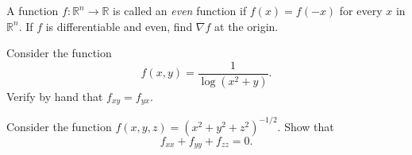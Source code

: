 \documentclass[openany]{book}
\newcommand{\R}{\mathbb{R}}
\begin{document}
\begin{prob}
    A function $f\colon\R^n\to\R$ is called an \textit{even} function if $f(x)=f(-x)$ for every $x$ in $\R^n$. If $f$ is differentiable and even, find $\nabla f$ at the origin.
\end{prob}



\begin{prob}
    Consider the function
    \[f(x,y)=\frac1{\log(x^2+y)}.\]
    Verify by hand that $f_{xy}=f_{yx}$.
\end{prob}


\begin{prob}
    Consider the function $f(x,y,z)=\left(x^2+y^2+z^2\right)^{-1/2}$. Show that
    \[f_{xx}+f_{yy}+f_{zz}=0.\]
\end{prob}
\end{document}
